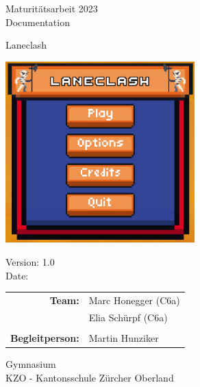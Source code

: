\begin{titlepage}

    \begin{center}

        \vspace{1 cm}

        {\Large Maturitätsarbeit 2023 \\ Documentation} \\

        \vspace{1 cm}

        \vspace{0.5cm}

        {\Huge Laneclash}

        \vspace{0.5cm}

        \vspace{1 cm}

        \includegraphics[height=7cm]{resources/laneclash.png}

        \vspace{1 cm}

        Version: 1.0 \\
        Date: \DTMnow \\
        \vspace{1 cm}

        \begin{tabular}{rl}
            \textbf{Team:}          & Marc Honegger (C6a) \\
                                    & Elia Schürpf (C6a)\\
                                    \\
            \textbf{Begleitperson:} & Martin Hunziker
        \end{tabular}

        \vfill

        \vspace{1cm}
        Gymnasium \\
        KZO - Kantonsschule Zürcher Oberland

    \end{center}

\end{titlepage}
